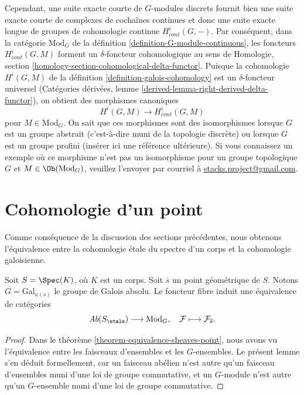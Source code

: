 \medskip\noindent
Cependant, une suite exacte courte de $G$-modules discrets fournit bien
une suite exacte courte de complexes de cocha\^ines continues
et donc une suite exacte longue de groupes de cohomologie
continue $H^i_{cont}(G, -)$.
Par cons\'equent, dans la cat\'egorie $\text{Mod}_G$ de la
d\'efinition \ref{definition-G-module-continuous}, les foncteurs
$H^i_{cont}(G, M)$ forment un $\delta$-foncteur cohomologique au sens de
Homologie, section \ref{homology-section-cohomological-delta-functor}.
Puisque la cohomologie $H^i(G, M)$
de la d\'efinition \ref{definition-galois-cohomology}
est un $\delta$-foncteur universel
(Cat\'egories d\'eriv\'ees, lemme \ref{derived-lemma-right-derived-delta-functor}),
on obtient des morphismes canoniques
$$
H^i(G, M) \longrightarrow H^i_{cont}(G, M)
$$
pour $M \in \text{Mod}_G$. On sait que ces morphismes sont des
isomorphismes lorsque $G$ est un groupe abstrait (c'est-\`a-dire muni de
la topologie discr\`ete) ou lorsque $G$ est un groupe profini
(ins\'erer ici une r\'ef\'erence ult\'erieure).
Si vous connaissez un exemple o\`u ce morphisme n'est pas un isomorphisme
pour un groupe topologique $G$ et $M \in \Ob(\text{Mod}_G)$,
veuillez l'envoyer par courriel \`a
\href{mailto:stacks.project@gmail.com}{stacks.project@gmail.com}.




\section{Cohomologie d'un point}
\label{section-cohomology-point}

\noindent
Comme cons\'equence de la discussion des sections pr\'ec\'edentes,
nous obtenons l'\'equivalence entre la cohomologie \'etale du spectre d'un
corps et la cohomologie galoisienne.

\begin{lemma}
\label{lemma-equivalence-abelian-sheaves-point}
Soit $S = \Spec(K)$, o\`u $K$ est un corps.
Soit $\overline{s}$ un point g\'eom\'etrique de $S$.
Notons $G = \text{Gal}_{\kappa(s)}$ le groupe de Galois absolu.
Le foncteur fibre induit une \'equivalence de cat\'egories
$$
\textit{Ab}(S_\etale) \longrightarrow \text{Mod}_G,
\quad
\mathcal{F} \longmapsto \mathcal{F}_{\overline{s}}.
$$
\end{lemma}

\begin{proof}
Dans le
th\'eor\`eme \ref{theorem-equivalence-sheaves-point},
nous avons vu l'\'equivalence entre les faisceaux d'ensembles et les $G$-ensembles.
Le pr\'esent lemme s'en d\'eduit formellement, car un faisceau ab\'elien n'est autre
qu'un faisceau d'ensembles muni d'une loi de groupe commutative, et un $G$-module
n'est autre qu'un $G$-ensemble muni d'une loi de groupe commutative.
\end{proof}

